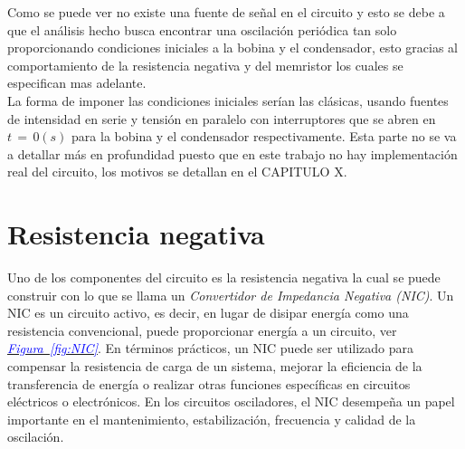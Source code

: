 \documentclass[12pt,a4paper]{report} %
\newcommand{\figureref}[1]{\hyperref[#1]{\textcolor{blue}{\textit{Figura~\ref*{#1}}}}}
\begin{document}
	Como se puede ver no existe una fuente de señal en el circuito y esto se debe a que el análisis hecho busca encontrar una oscilación periódica tan solo proporcionando condiciones iniciales a la bobina y el condensador, esto gracias al comportamiento de la resistencia negativa y del memristor los cuales se especifican mas adelante.\\[0.5cm]
	La forma de imponer las condiciones iniciales serían las clásicas, usando fuentes de intensidad en serie y tensión en paralelo con interruptores que se abren en $t\,=\,0(s)$ para la bobina y el condensador respectivamente. Esta parte no se va a detallar más en profundidad puesto que en este trabajo no hay implementación real del circuito, los motivos se detallan en el CAPITULO X.
	\newpage
	\section{Resistencia negativa}
	Uno de los componentes del circuito es la resistencia negativa la cual se puede construir con lo que se llama un \emph{Convertidor de Impedancia Negativa (NIC)}. Un NIC es un circuito activo, es decir, en lugar de disipar energía como una resistencia convencional, puede proporcionar energía a un circuito, ver \figureref{fig:NIC}. En términos prácticos, un NIC puede ser utilizado para compensar la resistencia de carga de un sistema, mejorar la eficiencia de la transferencia de energía o realizar otras funciones específicas en circuitos eléctricos o electrónicos. En los circuitos osciladores, el NIC desempeña un papel importante en el mantenimiento, estabilización, frecuencia y calidad de la oscilación.
	 
\end{document}
